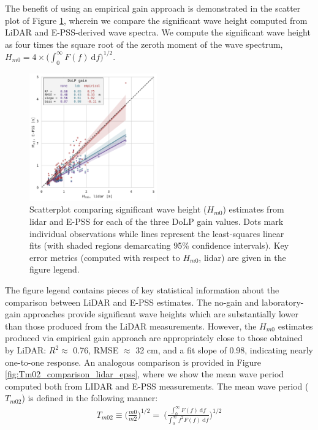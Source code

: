\documentclass[letterpaper,journal]{IEEEtran}
\begin{document}
The benefit of using an empirical gain approach is demonstrated in the scatter plot of Figure \ref{fig:Hm0_comparison_lidar_epss}, wherein we compare the significant wave height computed from LiDAR and E-PSS-derived wave spectra. We compute the significant wave height as four times the square root of the zeroth moment of the wave spectrum, $H_{m0}=4\times\Big(\int_0^\infty F(f)~\mathrm{d}f\Big)^{1/2}$.

\begin{figure}[!ht]
    \centering
    \includegraphics[width=0.49\textwidth]{_figures/Hm0_comparison_lidar_epss.pdf}
    \vspace{-20pt}
    \caption{Scatterplot comparing significant wave height ($H_{m0}$) estimates from lidar and E-PSS for each of the three DoLP gain values. Dots mark individual observations while lines represent the least-squares linear fits (with shaded regions demarcating 95\% confidence intervals). Key error metrics (computed with respect to $H_{m0}$, lidar) are given in the figure legend.}
    \vspace{-10pt}
    \label{fig:Hm0_comparison_lidar_epss}
\end{figure}

The figure legend contains pieces of key statistical information about the comparison between LiDAR and E-PSS estimates. The no-gain and laboratory-gain approaches provide significant wave heights which are substantially lower than those produced from the LiDAR measurements. However, the $H_{m0}$ estimates produced via empirical gain approach are appropriately close to those obtained by LiDAR: $R^2\approx$ 0.76, RMSE $\approx$ 32 cm, and a fit slope of 0.98, indicating nearly one-to-one response.
An analogous comparison is provided in Figure \ref{fig:Tm02_comparison_lidar_epss}, where we show the mean wave period computed both from LIDAR and E-PSS measurements. The mean wave period ($T_{m02}$) is defined in the following manner:
\begin{align}
    T_{m02}\equiv\Big(\frac{m0}{m2}\Big)^{1/2}=~ \Bigg(\frac{\int_0^\infty F(f)~\mathrm{d}f}{\int_0^\infty f^2F(f)~\mathrm{d}f}\Bigg)^{1/2}
\end{align}
\end{document}
